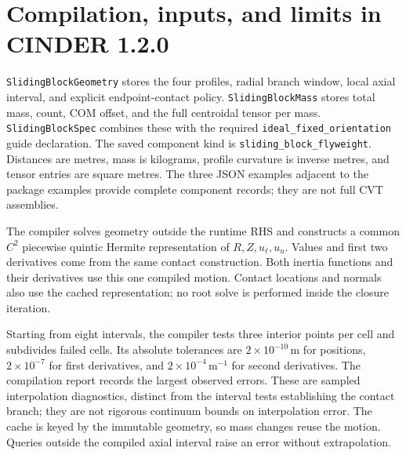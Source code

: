 \documentclass[11pt,letterpaper]{article}
\numberwithin{equation}{section}
\begin{document}
\section{Compilation, inputs, and limits in CINDER 1.2.0}

\texttt{SlidingBlockGeometry} stores the four profiles, radial branch window,
local axial interval, and explicit endpoint-contact policy.
\texttt{SlidingBlockMass} stores total mass, count, COM offset, and the full
centroidal tensor per mass. \texttt{SlidingBlockSpec} combines these with the
required \texttt{ideal\_fixed\_orientation} guide declaration.
The saved component kind is \texttt{sliding\_block\_flyweight}. Distances are
metres, mass is kilograms, profile curvature is inverse metres, and tensor
entries are square metres. The three JSON examples adjacent to the package
examples provide complete component records; they are not full CVT assemblies.

The compiler solves geometry outside the runtime RHS and constructs a common
$C^2$ piecewise quintic Hermite representation of $R,Z,u_\ell,u_u$. Values and
first two derivatives come from the same contact construction. Both inertia
functions and their derivatives use this one compiled motion. Contact
locations and normals also use the cached representation; no root solve is
performed inside the closure iteration.

Starting from eight intervals, the compiler tests three interior points per
cell and subdivides failed cells. Its absolute tolerances are
$2\times10^{-10}\,\mathrm m$ for positions,
$2\times10^{-7}$ for first derivatives, and
$2\times10^{-4}\,\mathrm{m^{-1}}$ for second derivatives.
The compilation report records the largest observed errors. These are sampled
interpolation diagnostics, distinct from the interval tests establishing the
contact branch; they are not rigorous continuum bounds on interpolation error.
The cache is keyed by the immutable geometry, so mass changes reuse the motion.
Queries outside the compiled axial interval raise an error without extrapolation.
\end{document}
